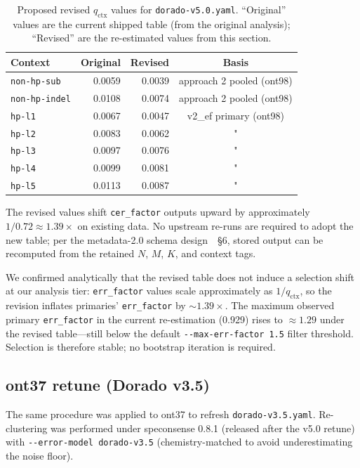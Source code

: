 \documentclass[11pt]{article}
\begin{document}
\begin{table}[h]
\centering
\caption{Proposed revised $q_\text{ctx}$ values for
\texttt{dorado-v5.0.yaml}. ``Original'' values are the current shipped
table (from the original analysis); ``Revised'' are the re-estimated values
from this section.}
\label{tab:revised_qctx}
\begin{tabular}{lrrc}
\toprule
Context & Original & Revised & Basis \\
\midrule
\texttt{non-hp-sub}   & 0.0059 & 0.0039 & approach 2 pooled (ont98) \\
\texttt{non-hp-indel} & 0.0108 & 0.0074 & approach 2 pooled (ont98) \\
\midrule
\texttt{hp-l1}        & 0.0067 & 0.0047 & v2\_ef primary (ont98) \\
\texttt{hp-l2}        & 0.0083 & 0.0062 & " \\
\texttt{hp-l3}        & 0.0097 & 0.0076 & " \\
\texttt{hp-l4}        & 0.0099 & 0.0081 & " \\
\texttt{hp-l5}        & 0.0113 & 0.0087 & " \\
\bottomrule
\end{tabular}
\end{table}

The revised values shift \texttt{cer\_factor} outputs upward by
approximately $1/0.72 \approx 1.39\times$ on existing data. No upstream
re-runs are required to adopt the new table; per the metadata-2.0 schema
design~\cite{cer_practice}~\S6, stored output can be recomputed from the
retained $N$, $M$, $K$, and context tags.

We confirmed analytically that the revised table does not induce a selection
shift at our analysis tier: \texttt{err\_factor} values scale approximately
as $1/q_\text{ctx}$, so the revision inflates primaries'
\texttt{err\_factor} by ${\sim}1.39\times$. The maximum observed primary
\texttt{err\_factor} in the current re-estimation (0.929) rises to
$\approx 1.29$ under the revised table---still below the default
\texttt{-{}-max-err-factor~1.5} filter threshold. Selection is therefore
stable; no bootstrap iteration is required.

\subsection{ont37 retune (Dorado v3.5)}
\label{sec:reestimation_ont37}

The same procedure was applied to ont37 to refresh
\texttt{dorado-v3.5.yaml}. Re-clustering was performed under speconsense
0.8.1 (released after the v5.0 retune) with
\texttt{-{}-error-model~dorado-v3.5} (chemistry-matched to avoid
underestimating the noise floor).
\end{document}
